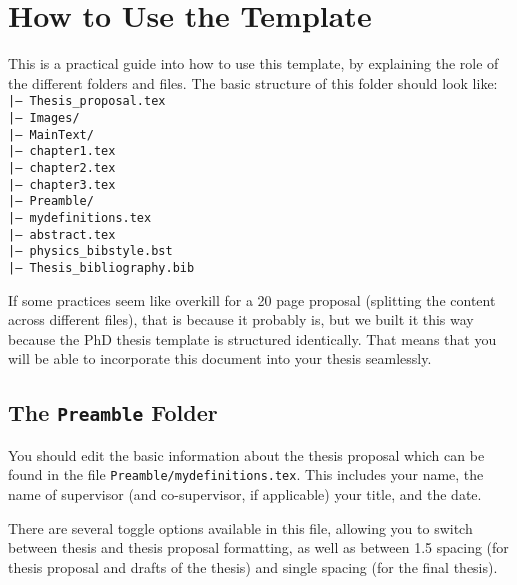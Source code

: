 \chapter{How to Use the Template} \label{ch-2}

This is a practical guide into how to use this template, by explaining the role
of the different folders and files. The basic structure of this folder should
look like:
\texttt{
\\
|--- Thesis\_proposal.tex \\ 
|--- Images/ \\ 
|--- MainText/ \\ 
\hspace*{0.5cm}|--- chapter1.tex\\
\hspace*{0.5cm}|--- chapter2.tex\\
\hspace*{0.5cm}|--- chapter3.tex\\
|--- Preamble/ \\ 
\hspace*{0.5cm}|--- mydefinitions.tex\\
\hspace*{0.5cm}|--- abstract.tex\\
\hspace*{0.5cm}|--- physics\_bibstyle.bst\\
\hspace*{0.5cm}|--- Thesis\_bibliography.bib\\
}

If some practices seem like overkill for a 20 page proposal (splitting the
content across different files), that is because it probably is, but we built
it this way because the PhD thesis template is structured identically. That
means that you will be able to incorporate this document into your thesis seamlessly.

\section{The \texttt{Preamble} Folder}

You should edit the basic information about the thesis proposal
which can be found in the file \texttt{Preamble/mydefinitions.tex}. This includes
your name, the name of supervisor (and co-supervisor, if applicable) your title, 
and the date.

There are several toggle options available in this file, allowing you to
switch between thesis and thesis proposal formatting, as well as between
1.5 spacing (for thesis proposal and drafts of the thesis) and single
spacing (for the final thesis).

